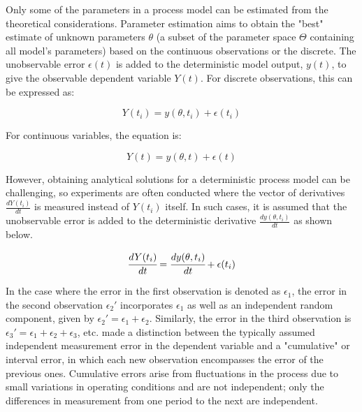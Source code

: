 \documentclass[../Article_Model_Parameters.tex]{subfiles}
\begin{document}
	Only some of the parameters in a process model can be estimated from the theoretical considerations. Parameter estimation aims to obtain the "best" estimate of unknown parameters $\theta$ (a subset of the parameter space $\Theta$ containing all model's parameters) based on the continuous observations or the discrete. The unobservable error $\epsilon(t)$ is added to the deterministic model output, $y(t)$, to give the observable dependent variable $Y(t)$. For discrete observations, this can be expressed as:
	
	{\footnotesize
		\begin{equation*}
			Y(t_i) = y(\theta, t_i) + \epsilon(t_i)
	\end{equation*} }
	
	For continuous variables, the equation is:
	
	{\footnotesize
		\begin{equation*}
			Y(t) = y(\theta, t) + \epsilon(t)
	\end{equation*} }
	
	However, obtaining analytical solutions for a deterministic process model can be challenging, so experiments are often conducted where the vector of derivatives $\frac{dY(t_i)}{dt}$ is measured instead of $Y(t_i)$ itself. In such cases, it is assumed that the unobservable error is added to the deterministic derivative $\frac{dy(\theta, t_i)}{dt}$ as shown below.
	
	{\footnotesize
		\begin{equation}  \label{EQ: Measurment_noise}
			\cfrac{d Y(t_i)}{dt} = \cfrac{dy(\theta, t_i)}{dt} + \epsilon(t_i)
	\end{equation} }
	
	In the case where the error in the first observation is denoted as $\epsilon_1$, the error in the second observation $\epsilon_2'$ incorporates $\epsilon_1$ as well as an independent random component, given by $\epsilon_2' = \epsilon_1 + \epsilon_2$. Similarly, the error in the third observation is $\epsilon_3' = \epsilon_1 + \epsilon_2 + \epsilon_3$, etc. \citet{Mandel1957}  made a distinction between the typically assumed independent measurement error in the dependent variable and a "cumulative" or interval error, in which each new observation encompasses the error of the previous ones. Cumulative errors arise from fluctuations in the process due to small variations in operating conditions and are not independent; only the differences in measurement from one period to the next are independent.
	
\end{document}
